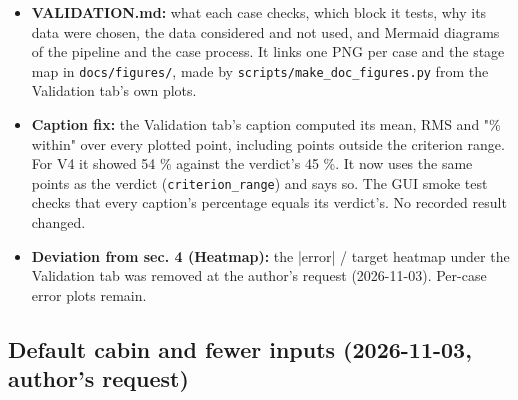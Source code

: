 \documentclass[10pt,a4paper]{article}
\begin{document}
\begin{itemize}
\item \textbf{VALIDATION.md:} what each case checks, which block it tests, why its data were chosen, the data considered and not used, and Mermaid diagrams of the pipeline and the case process. It links one PNG per case and the stage map in \texttt{docs/\allowbreak{}figures/\allowbreak{}}, made by \texttt{scripts/\allowbreak{}make\_\allowbreak{}doc\_\allowbreak{}figures.\allowbreak{}py} from the Validation tab's own plots.
\item \textbf{Caption fix:} the Validation tab's caption computed its mean, RMS and "\% within" over every plotted point, including points outside the criterion range. For V4 it showed 54 \% against the verdict's 45 \%. It now uses the same points as the verdict (\texttt{criterion\_\allowbreak{}range}) and says so. The GUI smoke test checks that every caption's percentage equals its verdict's. No recorded result changed.
\item \textbf{Deviation from sec. 4 (Heatmap):} the |error| / target heatmap under the Validation tab was removed at the author's request (2026-11-03). Per-case error plots remain.
\end{itemize}

\subsection*{Default cabin and fewer inputs (2026-11-03, author's request)}
\end{document}
